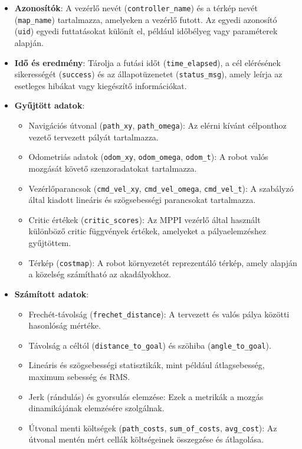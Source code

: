 \begin{itemize}
    \item \textbf{Azonosítók}: A vezérlő nevét (\texttt{controller\_name}) és a térkép nevét (\texttt{map\_name}) tartalmazza, amelyeken a vezérlő futott. Az egyedi azonosító (\texttt{uid}) egyedi futtatásokat különít el, például időbélyeg vagy paraméterek alapján.
    \item \textbf{Idő és eredmény}: Tárolja a futási időt (\texttt{time\_elapsed}), a cél elérésének sikerességét (\texttt{success}) és az állapotüzenetet (\texttt{status\_msg}), amely leírja az esetleges hibákat vagy kiegészítő információkat.
    \item \textbf{Gyűjtött adatok}: 
    \begin{itemize}
        \item Navigációs útvonal (\texttt{path\_xy}, \texttt{path\_omega}): Az elérni kívánt célponthoz vezető tervezett pályát tartalmazza.
        \item Odometriás adatok (\texttt{odom\_xy}, \texttt{odom\_omega}, \texttt{odom\_t}): A robot valós mozgását követő szenzoradatokat tartalmazza.
        \item Vezérlőparancsok (\texttt{cmd\_vel\_xy}, \texttt{cmd\_vel\_omega}, \texttt{cmd\_vel\_t}): A szabályzó által kiadott lineáris és szögsebességi parancsokat tartalmazza.
        \item Critic értékek (\texttt{critic\_scores}): Az MPPI vezérlő által használt különböző critic függvények értékek, amelyeket a pályaelemzéshez gyűjtöttem.
        \item Térkép (\texttt{costmap}): A robot környezetét reprezentáló térkép, amely alapján a közelség számítható az akadályokhoz.
    \end{itemize}
    
    \item \textbf{Számított adatok}: 
    \begin{itemize}
        \item Frechét-távolság (\texttt{frechet\_distance}): A tervezett és valós pálya közötti hasonlóság mértéke.
        \item Távolság a céltól (\texttt{distance\_to\_goal}) és szöhiba (\texttt{angle\_to\_goal}).
        \item Lineáris és szögsebességi statisztikák, mint például átlagsebesség, maximum sebesség és RMS.
        \item Jerk (rándulás) és gyorsulás elemzése: Ezek a metrikák a mozgás dinamikájának elemzésére szolgálnak.
        \item Útvonal menti költségek (\texttt{path\_costs}, \texttt{sum\_of\_costs}, \texttt{avg\_cost}): Az útvonal mentén mért cellák költségeinek összegzése és átlagolása.
    \end{itemize}
\end{itemize}

